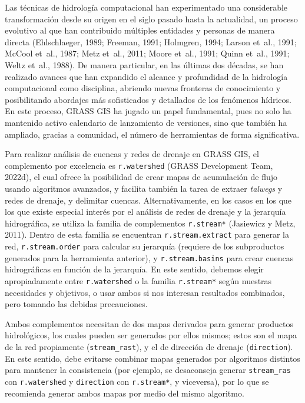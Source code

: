 \documentclass[spanish]{article}
\begin{document}
Las técnicas de hidrología computacional han experimentado una
considerable transformación desde su origen en el siglo pasado hasta la
actualidad, un proceso evolutivo al que han contribuido múltiples
entidades y personas de manera directa (Ehlschlaeger, 1989; Freeman,
1991; Holmgren, 1994; Larson et~al., 1991; McCool et~al., 1987; Metz
et~al., 2011; Moore et~al., 1991; Quinn et~al., 1991; Weltz et~al.,
1988). De manera particular, en las últimas dos décadas, se han
realizado avances que han expandido el alcance y profundidad de la
hidrología computacional como disciplina, abriendo nuevas fronteras de
conocimiento y posibilitando abordajes más sofisticados y detallados de
los fenómenos hídricos. En este proceso, GRASS GIS ha jugado un papel
fundamental, pues no solo ha mantenido activo calendario de lanzamiento
de versiones, sino que también ha ampliado, gracias a comunidad, el
número de herramientas de forma significativa.

Para realizar análisis de cuencas y redes de drenaje en GRASS GIS, el
complemento por excelencia es \texttt{r.watershed} (GRASS Development
Team, 2022d), el cual ofrece la posibilidad de crear mapas de
acumulación de flujo usando algoritmos avanzados, y facilita también la
tarea de extraer \emph{talwegs} y redes de drenaje, y delimitar cuencas.
Alternativamente, en los casos en los que los que existe especial
interés por el análisis de redes de drenaje y la jerarquía hidrográfica,
se utiliza la familia de complementos \texttt{r.stream*} (Jasiewicz y
Metz, 2011). Dentro de esta familia se encuentran
\texttt{r.stream.extract} para generar la red, \texttt{r.stream.order}
para calcular su jerarquía (requiere de los subproductos generados para
la herramienta anterior), y \texttt{r.stream.basins} para crear cuencas
hidrográficas en función de la jerarquía. En este sentido, debemos
elegir apropiadamente entre \texttt{r.watershed} o la familia
\texttt{r.stream*} según nuestras necesidades y objetivos, o usar ambos
si nos interesan resultados combinados, pero tomando las debidas
precauciones.

Ambos complementos necesitan de dos mapas derivados para generar
productos hidrológicos, los cuales pueden ser generados por ellos
mismos; estos son el mapa de la red propiamente (\texttt{stream\_rast}),
y el de dirección de drenaje (\texttt{direction}). En este sentido, debe
evitarse combinar mapas generados por algoritmos distintos para mantener
la consistencia (por ejemplo, se desaconseja generar
\texttt{stream\_ras} con \texttt{r.watershed} y \texttt{direction} con
\texttt{r.stream*}, y viceversa), por lo que se recomienda generar ambos
mapas por medio del mismo algoritmo.
\end{document}
